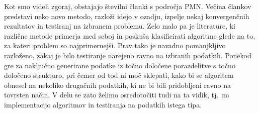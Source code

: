 Kot smo videli zgoraj, obstajajo številni članki s področja PMN. Večina člankov predstavi neko novo metodo, razloži idejo v ozadju, izpelje nekaj konvergenčnih rezultatov in testiranj na izbranem problemu.
Zelo malo pa je literature, ki različne metode primerja med seboj in poskuša klasificirati algoritme glede na to, za kateri problem so najprimernejši. Prav tako je navadno pomanjkljivo razloženo, zakaj je bilo testiranje narejeno ravno na izbranih podatkih. Ponekod gre za naključno generirane podatke iz točno določene porazdelitve s točno določeno strukturo, pri čemer od tod ni moč sklepati, kako bi se algoritem obnesel na nekoliko drugačnih podatkih, ki ne bi bili pridobljeni ravno na tovrsten način. V delu se zato želimo osredotočiti tudi na ta vidik, tj.\ na implementacijo algoritmov in testiranja na podatkih istega tipa.
